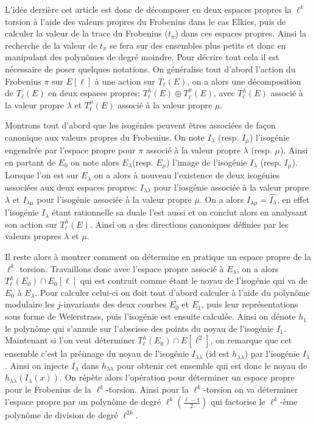\documentclass[10pt,a4paper]{book}
\theoremstyle{plain}
\theoremstyle{definition}
\theoremstyle{definition}
\theoremstyle{definition}
\theoremstyle{definition}
\theoremstyle{remark}
\theoremstyle{remark}
\begin{document}
L'idée derrière cet article est donc de décomposer en deux espaces propres la $\ell^k$ torsion à l'aide des valeurs propres du Frobenius dans le cas Elkies, puis de calculer la valeur de la trace du Frobenius ($t_{\pi}$) dans ces espaces propres. Ainsi la recherche de la valeur de $t_{\pi}$ se fera sur des ensembles plus petits et donc en manipulant des polynômes de degré moindre. Pour décrire tout cela il est nécessaire de poser quelques notations. On généralise tout d'abord l'action du Frobenius $\pi$ sur $E[\ell]$ à une action sur $T_{\ell}(E)$, on a alors une décomposition de $T_{\ell}(E)$ en deux espaces propres: $T_{\ell}^{\lambda}(E) \oplus T_{\ell}^{\mu}(E)$, avec $T_{\ell}^{\lambda}(E)$ associé à la valeur propre $\lambda$ et $T_{\ell}^{\mu}(E)$ associé à la valeur propre $\mu$. 


Montrons tout d'abord que les isogénies peuvent êtres associées de façon canonique aux valeurs propres du Frobenius. On note $I_{\lambda}$ (resp. $I_{\mu}$) l'isogénie engendrée par l'espace propre pour $\pi$ associé à la valeur propre $\lambda$ (resp. $\mu$). Ainsi en partant de $E_0$ on note alors $E_{\lambda}$(resp. $E_{\mu}$) l'image de l'isogénie $I_{\lambda}$ (resp. $I_{\mu}$). Lorsque l'on est sur $E_{\lambda}$ on a alors à nouveau l'existence de deux isogénies associées aux deux espaces propres: $I_{\lambda \lambda}$ pour l'iosgénie associée à la valeur propre $\lambda$ et $I_{\lambda \mu}$ pour l'isogénie associée à la valeur propre $\mu$. On a alors $I_{\lambda \mu}=\widehat{I_{\lambda}}$, en effet l'isogénie $I_{\lambda}$ étant rationnelle sa duale l'est aussi et on conclut alors en analysant son action sur $T_{\ell}^{\lambda}(E)$. Ainsi on a des directions canoniques définies par les valeurs propres $\lambda$ et $\mu$. 

Il reste alors à montrer comment on détermine en pratique un espace propre de la $\ell^k$ torsion. Travaillons donc avec l'espace propre associé à $E_{\lambda}$, on a alors $T_{\ell}^{\lambda}(E_0) \cap E_0[\ell]$ qui est contruit comme étant le noyau de l'isogénie qui va de $E_0$ à $E_{\lambda}$. Pour calculer celui-ci on doit tout d'abord calculer à l'aide du polynôme modulaire les $j$-invariants des deux courbes $E_0$ et $E_1$, puis leur représentations sous forme de Weierstrass, puis l'isogénie est ensuite calculée. Ainsi on dénote $h_1$ le polynôme qui s'annule sur l'abscisse des points du noyau de l'isogénie $I_1$. 
Maintenant si l'on veut déterminer $T_{\ell}^{\lambda}(E_0) \cap E[\ell^2]$, on remarque que cet ensemble c'est la préimage du noyau de l'isogénie $I_{\lambda \lambda}$ (id est $h_{\lambda \lambda}$) par l'isogénie $I_{\lambda}$. Ainsi on injecte $I_{\lambda}$ dans $h_{\lambda \lambda}$ pour obtenir cet ensemble qui est donc le noyau de $h_{\lambda \lambda}(I_{\lambda}(x))$. On répète alors l'opération pour déterminer un espace propre pour le Frobenius de la $\ell^k$-torsion. Ainsi pour la $\ell^k$-torsion on va déterminer l'espace propre par un polynôme de degré $\ell^k  (\frac{\ell-1}{2})$ qui factorise le $\ell^k$-ème polynôme de division de degré $\ell^{2k}$.
\end{document}

